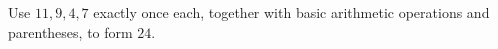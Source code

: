 Use $11,9,4,7$ exactly once each, together with basic arithmetic operations and parentheses, to form $24$.
